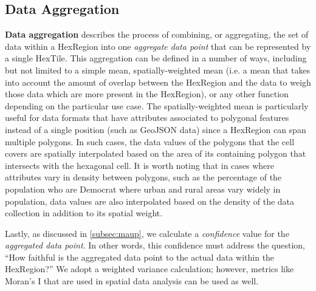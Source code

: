 \subsection{Data Aggregation}
%
\textbf{Data aggregation} describes the process of combining, or aggregating, the set of data within a HexRegion into one \textit{aggregate data point} that can be represented by a single HexTile. 
%
This aggregation can be defined in a number of ways, including but not limited to a simple mean, spatially-weighted mean (i.e. a mean that takes into account the amount of overlap between the HexRegion and the data to weigh those data which are more present in the HexRegion), or any other function depending on the particular use case. 
%
The spatially-weighted mean is particularly useful for data formats that have attributes associated to polygonal features instead of a single position (such as GeoJSON data) since a HexRegion can span multiple polygons. 
%
In such cases, the data values of the polygons that the cell covers are spatially interpolated based on the area of its containing polygon that intersects with the hexagonal cell. 
%
It is worth noting that in cases where attributes vary in density between polygons, such as the percentage of the population who are Democrat where urban and rural areas vary widely in population, data values are also interpolated based on the density of the data collection in addition to its spatial weight. 
%
%
%

Lastly, as discussed in \cref{subsec:maup}, we calculate a \textit{confidence} value for the \textit{aggregated data point}.
%
In other words, this confidence must address the question, ``How faithful is the aggregated data point to the actual data within the HexRegion?''
%
We adopt a weighted variance calculation; however, metrics like Moran's I that are used in spatial data analysis\cite{parenteau_modifiable_2011} can be used as well.
%
%

